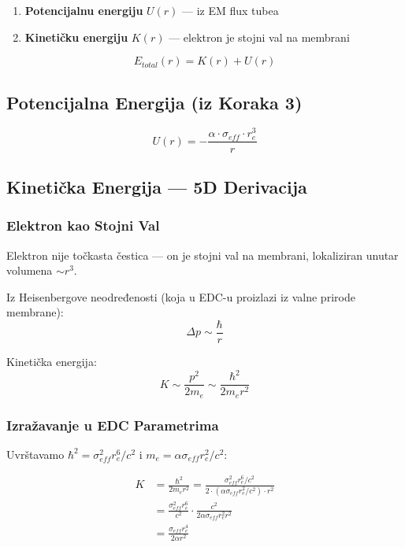 \documentclass[12pt,a4paper]{article}
\begin{document}
\begin{enumerate}
    \item \textbf{Potencijalnu energiju} $U(r)$ — iz EM flux tubea
    \item \textbf{Kinetičku energiju} $K(r)$ — elektron je stojni val na membrani
\end{enumerate}

\begin{equation}
E_{total}(r) = K(r) + U(r)
\end{equation}

\subsection{Potencijalna Energija (iz Koraka 3)}

\begin{equation}
U(r) = -\frac{\alpha \cdot \sigma_{eff} \cdot r_e^3}{r}
\end{equation}

\subsection{Kinetička Energija — 5D Derivacija}

\subsubsection{Elektron kao Stojni Val}

Elektron nije točkasta čestica — on je stojni val na membrani, lokaliziran unutar volumena $\sim r^3$.

Iz Heisenbergove neodređenosti (koja u EDC-u proizlazi iz valne prirode membrane):
\begin{equation}
\Delta p \sim \frac{\hbar}{r}
\end{equation}

Kinetička energija:
\begin{equation}
K \sim \frac{p^2}{2m_e} \sim \frac{\hbar^2}{2m_e r^2}
\end{equation}

\subsubsection{Izražavanje u EDC Parametrima}

Uvrštavamo $\hbar^2 = \sigma_{eff}^2 r_e^6 / c^2$ i $m_e = \alpha \sigma_{eff} r_e^2 / c^2$:

\begin{align}
K &= \frac{\hbar^2}{2m_e r^2} = \frac{\sigma_{eff}^2 r_e^6 / c^2}{2 \cdot (\alpha \sigma_{eff} r_e^2 / c^2) \cdot r^2} \\
&= \frac{\sigma_{eff}^2 r_e^6}{c^2} \cdot \frac{c^2}{2\alpha \sigma_{eff} r_e^2 r^2} \\
&= \frac{\sigma_{eff} r_e^4}{2\alpha r^2}
\end{align}
\end{document}
